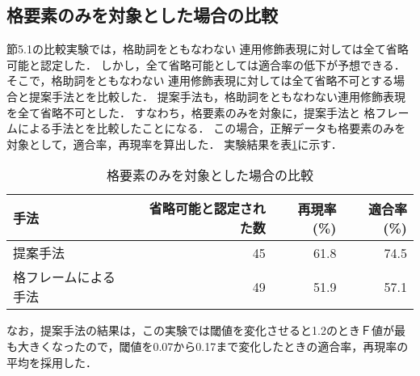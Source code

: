\subsection{格要素のみを対象とした場合の比較}
節5.1の比較実験では，格助詞をともなわない
連用修飾表現に対しては全て省略可能と認定した．
しかし，全て省略可能としては適合率の低下が予想できる．
そこで，格助詞をともなわない
連用修飾表現に対しては全て省略不可とする場合と提案手法とを比較した．
提案手法も，格助詞をともなわない連用修飾表現を全て省略不可とした．
すなわち，格要素のみを対象に，提案手法と
格フレームによる手法とを比較したことになる．
この場合，正解データも格要素のみを対象として，適合率，再現率を算出した．
実験結果を表\ref{Experiment_Resul3}に示す．
\begin{table}[bt]
\begin{center}
\caption{格要素のみを対象とした場合の比較} \label{Experiment_Resul3}
\begin{tabular}{l|r|r|r}
\hline
手法 & 省略可能と認定された数 & 再現率(\%) & 適合率(\%)\\ \hline \hline
提案手法 & 45 & 61.8 & 74.5 \\
格フレームによる手法 & 49 & 51.9 & 57.1 \\
\hline
\end{tabular}
\end{center}
\end{table}
なお，提案手法の結果は，この実験では閾値を変化させると1.2のときＦ値が最も大きくなったので，閾値を0.07から0.17まで変化したときの適合率，再現率の平均を採用した．
